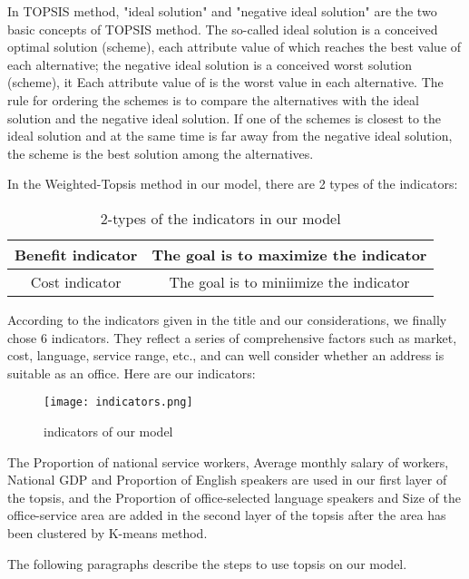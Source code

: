 \documentclass[12pt]{article}  %
\begin{document}
 In TOPSIS method, "ideal solution" and "negative ideal solution" are the two basic concepts of TOPSIS method. The so-called ideal solution is a conceived optimal solution (scheme), each attribute value of which reaches the best value of each alternative; the negative ideal solution is a conceived worst solution (scheme), it Each attribute value of is the worst value in each alternative. The rule for ordering the schemes is to compare the alternatives with the ideal solution and the negative ideal solution. If one of the schemes is closest to the ideal solution and at the same time is far away from the negative ideal solution, the scheme is the best solution among the alternatives.
 
 In the Weighted-Topsis method in our model, there are 2 types of the indicators:
 
 \begin{table}[H]
 	\begin{center}
 	\caption{2-types of the indicators in our model}
 	\begin{tabular}{|c|c|}
 		\hline
 		Benefit indicator & The goal is to maximize the indicator  \\ \hline
 		Cost indicator    & The goal is to miniimize the indicator \\ \hline
 	\end{tabular}
\end{center}
 \end{table}

According to the indicators given in the title and our considerations, we finally chose 6 indicators. They reflect a series of comprehensive factors such as market, cost, language, service range, etc., and can well consider whether an address is suitable as an office. Here are our indicators:

\begin{figure}[H]
	\centering
	\texttt{[image: indicators.png]}
	\caption{indicators of our model}\label{fig:indicators}
\end{figure}

The Proportion of national service workers, Average monthly salary of workers, National GDP and Proportion of English speakers are used in our first layer of the topsis, and the Proportion of office-selected language speakers and Size of the office-service area are added in the second layer of the topsis after the area has been clustered by K-means method.

The following paragraphs describe the steps to use topsis on our model.
\end{document}
